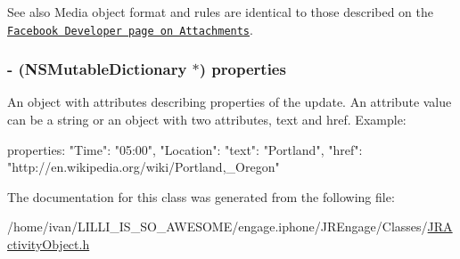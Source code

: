 \begin{DoxySeeAlso}{See also}
Media object format and rules are identical to those described on the \href{http://developers.facebook.com/docs/guides/attachments}{\tt Facebook Developer page on Attachments}. 
\end{DoxySeeAlso}
\hypertarget{interface_j_r_activity_object_a1acf84854d275510685a1f2066061c4e}{
\subsubsection[{properties}]{\setlength{\rightskip}{0pt plus 5cm}-\/ (NSMutableDictionary $\ast$) properties}}
\label{interface_j_r_activity_object_a1acf84854d275510685a1f2066061c4e}
An object with attributes describing properties of the update. An attribute value can be a string or an object with two attributes, text and href. Example: 
\begin{DoxyCode}
   properties: 
   {
       "Time": "05:00",
       "Location": 
       {
           "text": "Portland",
           "href": "http://en.wikipedia.org/wiki/Portland,_Oregon"
       }
   }
\end{DoxyCode}
 

The documentation for this class was generated from the following file:\begin{DoxyCompactItemize}
\item 
/home/ivan/LILLI\_\-IS\_\-SO\_\-AWESOME/engage.iphone/JREngage/Classes/\hyperlink{_j_r_activity_object_8h}{JRActivityObject.h}\end{DoxyCompactItemize}
